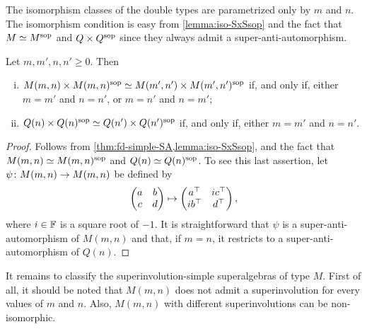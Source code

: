The isomorphism classes of the double types are parametrized only by $m$ and $n$. 
The isomorphism condition is easy from \cref{lemma:iso-SxSsop} and the fact that $M\simeq M^{\mathrm{sop}}$ and $Q\times Q^{\mathrm{sop}}$ since they always admit a super-anti-automorphism.

\begin{prop}
    Let $m,m',n,n' \geq 0$. %
    Then 
    \begin{enumerate}[(i)]
        \item $M(m,n) \times M(m,n)^{\mathrm{sop}} \simeq M(m',n') \times M(m',n')^{\mathrm{sop}}$ if, and only if, either $m = m'$ and $n = n'$, or $m = n'$ and $n = m'$; 
        \item $Q(n) \times Q(n)^{\mathrm{sop}} \simeq Q(n') \times Q(n')^{\mathrm{sop}}$ if, and only if, either $m = m'$ and $n = n'$.
    \end{enumerate}
\end{prop}

\begin{proof}
    Follows from \cref{thm:fd-simple-SA,lemma:iso-SxSsop}, and the fact that $M(m,n) \simeq M(m,n)^{\mathrm{sop}}$ and $Q(n) \simeq Q(n)^{\mathrm{sop}}$. 
    To see this last assertion, let $\psi\colon M(m,n) \to M(m,n)$ be defined by 
    \[
        \begin{pmatrix}
            a & b\\
            c & d
        \end{pmatrix}
        \mapsto
        \begin{pmatrix}
            a^{\top} & ic^{\top}\\
            ib^{\top} & d^{\top}
        \end{pmatrix},
    \]
    where $i\in \mathbb{F}$ is a square root of $-1$. 
    It is straightforward that $\psi$ is a super-anti-automorphism of $M(m,n)$ and that, if $m=n$, it restricts to a super-anti-automorphism of $Q(n)$. 
\end{proof}

It remains to classify the superinvolution-simple superalgebras of type $M$. 
First of all, it should be noted that $M(m,n)$ does not admit a superinvolution for every values of $m$ and $n$. 
Also, $M(m,n)$ with different superinvolutions can be non-isomorphic.

